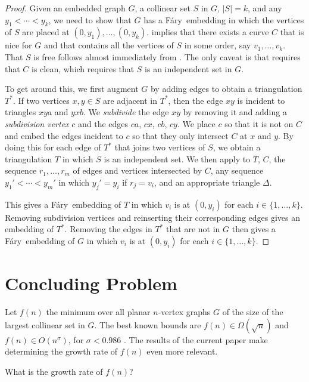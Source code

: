 \documentclass{patmorin}
\newcommand{\Fary}{Fáry}
\begin{document}
\begin{proof}
   Given an embedded graph $G$, a collinear set $S$ in $G$, $|S|=k$, and
   any $y_1<\cdots<y_k$, we need to show that $G$ has a \Fary\ embedding
   in which the vertices of $S$ are placed at $(0,y_1),\ldots,(0,y_k)$.
    implies that there exists a curve $C$ that is
   nice for $G$ and that contains all the vertices of $S$ in some order,
   say $v_1,\ldots,v_k$.  That $S$ is free follows almost immediately from
   .  The only caveat is that  requires that
   $C$ is clean, which requires that $S$ is an independent set in $G$.

   To get around this, we first augment $G$ by adding edges to obtain a
   triangulation $T^*$. If two vertices $x,y\in S$ are adjacent
   in $T^*$, then the edge $xy$ is incident to triangles $xya$ and
   $yxb$.  We \emph{subdivide} the edge $xy$ by removing it and adding
   a \emph{subdivision vertex} $c$ and the edges $ca$, $cx$, $cb$, $cy$.
   We place $c$ so that it is not on $C$ and embed the edges incident to
   $c$ so that they only intersect $C$ at $x$ and $y$.  By doing this
   for each edge of $T^*$ that joins two vertices of $S$, we obtain a
   triangulation $T$ in which $S$ is an independent set.  We then apply
    to $T$, $C$, the sequence $r_1,\ldots,r_m$ of edges
   and vertices intersected by $C$, any sequence $y_1'<\cdots<y_m'$
   in which $y_j'=y_i$ if $r_j=v_i$, and an appropriate triangle $\Delta$.

   This gives a \Fary\ embedding of $T$ in which $v_i$ is at $(0,y_i)$
   for each $i\in\{1,\ldots,k\}$.  Removing subdivision vertices and
   reinserting their corresponding edges gives an embedding of $T^*$.
   Removing the edges in $T^*$ that are not in $G$ then gives a
   \Fary\ embedding of $G$ in which $v_i$ is at $(0,y_i)$ for each
   $i\in\{1,\ldots,k\}$.
\end{proof}

\section{Concluding Problem}

Let $f(n)$ the minimum over all planar $n$-vertex graphs $G$ of the
size of the largest collinear set in $G$.  The best known bounds are
$f(n)\in\Omega(\sqrt{n})$ and $f(n)\in O(n^\sigma)$, for $\sigma
< 0.986$ \cite{bose.dujmovic.ea:polynomial,ravsky.verbitsky:on}.
The results of the current paper make determining the growth rate of
$f(n)$ even more relevant.

\begin{op}
   What is the growth rate of $f(n)$?
\end{op}




\end{document}

